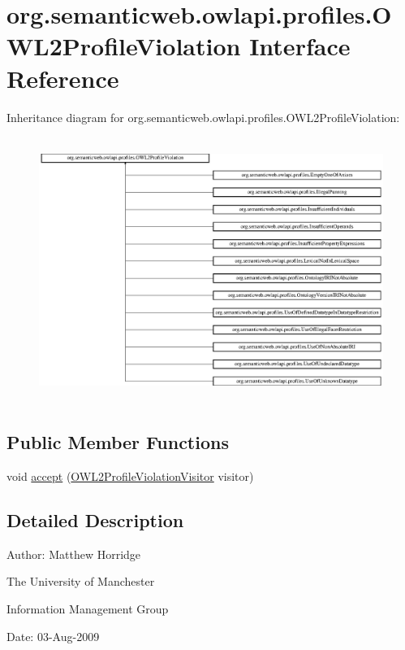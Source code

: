 \hypertarget{interfaceorg_1_1semanticweb_1_1owlapi_1_1profiles_1_1_o_w_l2_profile_violation}{\section{org.\-semanticweb.\-owlapi.\-profiles.\-O\-W\-L2\-Profile\-Violation Interface Reference}
\label{interfaceorg_1_1semanticweb_1_1owlapi_1_1profiles_1_1_o_w_l2_profile_violation}
}
Inheritance diagram for org.\-semanticweb.\-owlapi.\-profiles.\-O\-W\-L2\-Profile\-Violation\-:\begin{figure}[H]
\begin{center}
\leavevmode
\includegraphics[height=8.653421cm]{interfaceorg_1_1semanticweb_1_1owlapi_1_1profiles_1_1_o_w_l2_profile_violation}
\end{center}
\end{figure}
\subsection*{Public Member Functions}
\begin{DoxyCompactItemize}
\item 
void \hyperlink{interfaceorg_1_1semanticweb_1_1owlapi_1_1profiles_1_1_o_w_l2_profile_violation_a19cac8025010f82f6cd5662260faf6c7}{accept} (\hyperlink{interfaceorg_1_1semanticweb_1_1owlapi_1_1profiles_1_1_o_w_l2_profile_violation_visitor}{O\-W\-L2\-Profile\-Violation\-Visitor} visitor)
\end{DoxyCompactItemize}


\subsection{Detailed Description}
Author\-: Matthew Horridge\par
 The University of Manchester\par
 Information Management Group\par
 Date\-: 03-\/\-Aug-\/2009 

